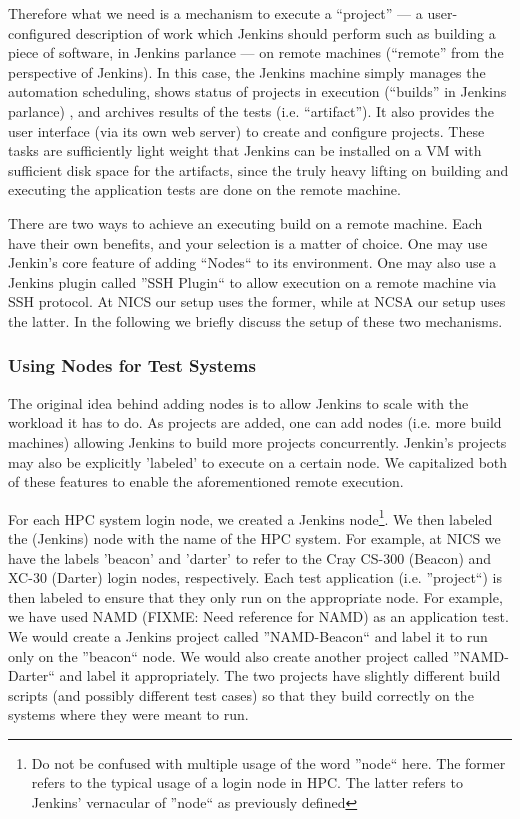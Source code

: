 \documentclass[10pt, conference, compsocconf]{IEEEtran}
\begin{document}
Therefore what we need is a mechanism to execute a ``project'' --- a user-configured description of work which Jenkins should perform such as building a piece of software, in Jenkins parlance --- on remote machines (``remote'' from the perspective of Jenkins). 
In this case, the Jenkins machine simply manages the automation scheduling, shows status of projects in execution (``builds'' in Jenkins parlance) , and archives results of the tests (i.e. ``artifact''). 
It also provides the user interface (via its own web server) to create and configure projects. 
These tasks are sufficiently light weight that Jenkins can be installed on a VM with sufficient disk space for the artifacts, since the truly heavy lifting on building and executing the application tests are done on the remote machine.

There are two ways to achieve an executing build on a remote machine. 
Each have their own benefits, and your selection is a matter of choice. 
One may use Jenkin's core feature of adding ``Nodes`` to its environment. 
One may also use a Jenkins plugin called ''SSH Plugin`` to allow execution on a remote machine via SSH protocol. 
At NICS our setup uses the former, while at NCSA our setup uses the latter. 
In the following we briefly discuss the setup of these two mechanisms.

\subsubsection{Using Nodes for Test Systems}
The original idea behind adding nodes is to allow Jenkins to scale with the workload it has to do. 
As projects are added, one can add nodes (i.e. more build machines) allowing Jenkins to build more projects concurrently. 
Jenkin's projects may also be explicitly 'labeled' to execute on a certain node. 
We capitalized both of these features to enable the aforementioned remote execution.

For each HPC system login node, we created a Jenkins node\footnote{Do not be confused with multiple usage of the word ''node`` here. 
The former refers to the typical usage of a login node in HPC. 
The latter refers to Jenkins' vernacular of ''node`` as previously defined}. 
We then labeled the (Jenkins) node with the name of the HPC system. 
For example, at NICS we have the labels 'beacon' and 'darter' to refer to the Cray CS-300 (Beacon) and XC-30 (Darter) login nodes, respectively. 
Each test application (i.e. ''project``) is then labeled to ensure that they only run on the appropriate node. 
For example, we have used NAMD (FIXME: Need reference for NAMD) as an application test. 
We would create a Jenkins project called ''NAMD-Beacon`` and label it to run only on the ''beacon`` node. 
We would also create another project called ''NAMD-Darter`` and label it appropriately. 
The two projects have slightly different build scripts (and possibly different test cases) so that they build correctly on the systems where they were meant to run.
\end{document}
